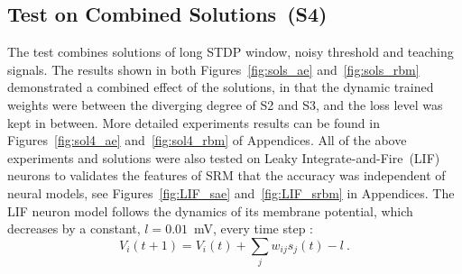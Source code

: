 \subsection{Test on Combined Solutions~(S4)}
The test combines solutions of long STDP window, noisy threshold and teaching signals.
The results shown in both Figures~\ref{fig:sols_ae} and~\ref{fig:sols_rbm} demonstrated a combined effect of the solutions, in that the dynamic trained weights were between the diverging degree of S2 and S3, and the loss level was kept in between.
More detailed experiments results can be found in Figures~\ref{fig:sol4_ae} and~\ref{fig:sol4_rbm} of Appendices.
All of the above experiments and solutions were also tested on Leaky Integrate-and-Fire~(LIF) neurons to validates the features of SRM that the accuracy was independent of neural models, see Figures~\ref{fig:LIF_sae} and~\ref{fig:LIF_srbm} in Appendices.
The LIF neuron model follows the dynamics of its membrane potential, which decreases by a constant, $l=0.01$~mV, every time step :
\begin{equation}
V_i(t+1)=V_i(t) + \sum_j w_{ij} s_j(t) - l~.
\end{equation}

